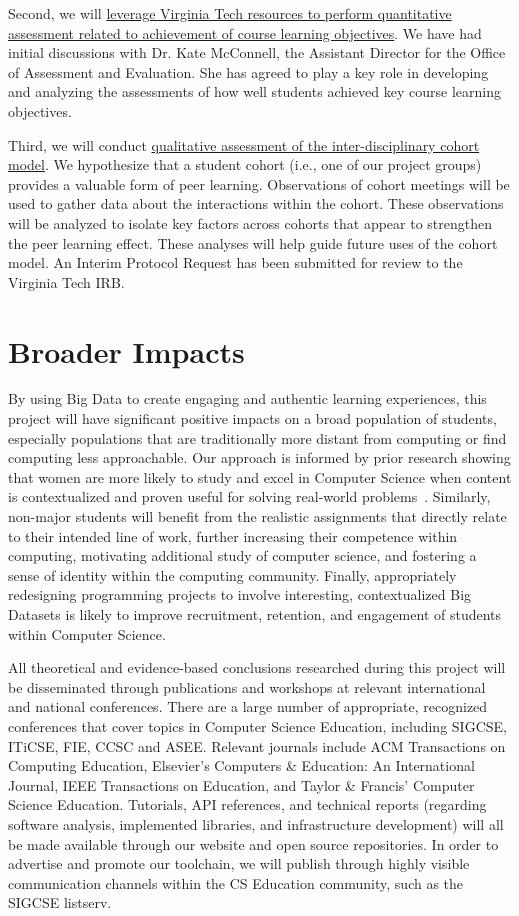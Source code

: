 \documentclass[11pt]{article}
\begin{document}
Second, we will \uline{leverage Virginia Tech resources to perform quantitative assessment related to achievement of course learning objectives}. We have had initial discussions with Dr. Kate
McConnell, the Assistant Director for the Office of Assessment and
Evaluation. She has agreed to play a key role in developing and
analyzing the assessments of how well students achieved key course
learning objectives.

Third, we will conduct \uline{qualitative assessment of the inter-disciplinary cohort model}. We hypothesize that a student
cohort (i.e., one of our project groups) provides a valuable form of peer
learning. Observations of cohort meetings will be used to gather data
about the interactions within the cohort. These observations will be
analyzed to isolate key factors across cohorts that appear to
strengthen the peer learning effect. These analyses will help guide
future uses of the cohort model. An Interim Protocol Request has been
submitted for review to the Virginia Tech IRB.


\section{Broader Impacts}

By using Big Data to create engaging and authentic learning experiences, this project will have significant positive impacts on a broad population of students, especially populations that are traditionally more distant from computing or find computing less approachable.
Our approach is informed by prior research showing that women are more likely to study and excel in Computer Science when content is contextualized and proven useful for solving real-world problems~\cite{Fisher,Carter2006}. 
Similarly, non-major students will benefit from the realistic assignments that directly relate to their intended line of work, further increasing their competence within computing, motivating additional study of computer science, and fostering a sense of identity within the computing community.
Finally, appropriately redesigning programming projects to involve interesting, contextualized Big Datasets is likely to improve recruitment, retention, and engagement of students within Computer Science.

All theoretical and evidence-based conclusions researched during this project will be disseminated through publications and workshops at relevant international and national conferences. 
There are a large number of appropriate, recognized conferences that cover topics in Computer Science Education, including SIGCSE, ITiCSE, FIE, CCSC and ASEE.
Relevant journals include ACM Transactions on Computing Education, Elsevier's Computers \& Education: An International Journal, IEEE Transactions on Education, and Taylor \& Francis' Computer Science Education.
Tutorials, API references, and technical reports (regarding software analysis, implemented libraries, and infrastructure development) will all be made available through our website and open source repositories.
In order to advertise and promote our toolchain, we will publish through highly visible communication channels within the CS Education community, such as the SIGCSE listserv.
\end{document}
